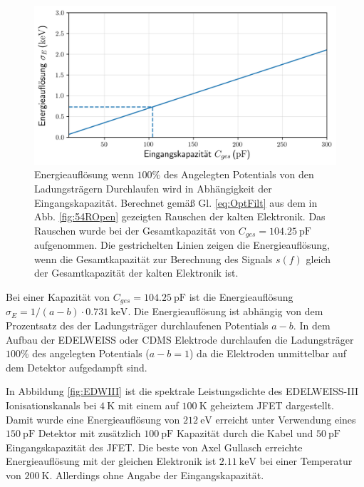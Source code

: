 \begin{figure}[!t]
\begin{center}
\includegraphics[width=\textwidth]{./fig/Resolution.png}
\vspace{-0.5cm}
\caption{Energieauflösung wenn $100\%$ des Angelegten Potentials von den Ladungsträgern Durchlaufen wird in Abhängigkeit der Eingangskapazität.
Berechnet gemäß Gl. \eqref{eq:OptFilt} aus dem in Abb. \ref{fig:54ROpen} gezeigten Rauschen der kalten Elektronik.
Das Rauschen wurde bei der Gesamtkapazität von $C_{ges}=\SI{104,25}{\pico\farad}$ aufgenommen.
Die gestrichelten Linien zeigen die Energieauflösung, wenn die Gesamtkapazität zur Berechnung des Signals $s(f)$ gleich der Gesamtkapazität der kalten Elektronik ist.}
\label{fig:Resolution}
\end{center}
\end{figure}

Bei einer Kapazität von $C_{ges}=\SI{104,25}{\pico\farad}$ ist die Energieauflösung $\sigma_E = 1/(a-b)\cdot \SI{0,731}{\kilo\electronvolt}$.
Die Energieauflösung ist abhängig von dem Prozentsatz des der Ladungsträger durchlaufenen Potentials $a-b$.
In dem Aufbau der EDELWEISS oder CDMS Elektrode durchlaufen die Ladungsträger $100\%$ des angelegten Potentials ($a-b=1$) da die Elektroden unmittelbar auf dem Detektor aufgedampft sind.

In Abbildung \ref{fig:EDWIII} ist die spektrale Leistungsdichte des EDELWEISS-III Ionisationskanals bei $\SI{4}{\kelvin}$ mit einem auf $\SI{100}{\kelvin}$ geheiztem JFET dargestellt.
Damit wurde eine Energieauflösung von $\SI{212}{\electronvolt}$ erreicht\cite{EDWIII} unter Verwendung eines $\SI{150}{\pico\farad}$ Detektor mit zusätzlich $\SI{100}{\pico\farad}$ Kapazität durch die Kabel und $\SI{50}{\pico\farad}$ Eingangskapazität des JFET.
Die beste von Axel Gullasch erreichte Energieauflösung mit der gleichen Elektronik ist $\SI{2.11}{\kilo\electronvolt}$ bei einer Temperatur von $\SI{200}{\kelvin}$\cite{Gullasch2015}.
Allerdings ohne Angabe der Eingangskapazität.

